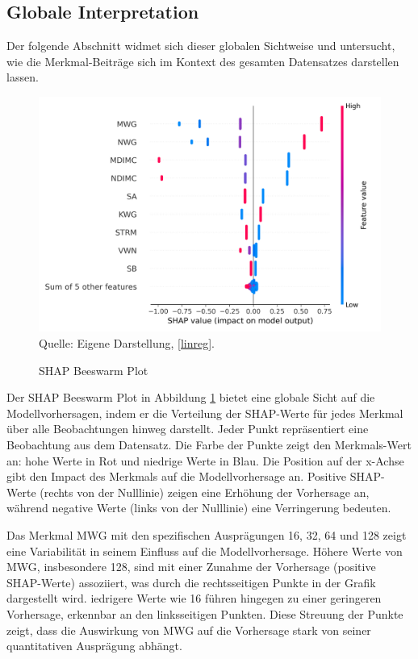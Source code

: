 \subsection{Globale Interpretation}

Der folgende Abschnitt widmet sich dieser globalen Sichtweise und untersucht, 
wie die Merkmal-Beiträge sich im Kontext des gesamten Datensatzes darstellen lassen.

\begin{figure}[!h]
    \caption{SHAP Beeswarm Plot}
    \includegraphics[width=1\textwidth]{../scripts/images/shap_beeswarm_plot_gpu.png}
    Quelle: Eigene Darstellung, \ref{linreg}.
    \label{pic:shap_beeswarm}
\end{figure}

Der SHAP Beeswarm Plot in Abbildung \ref{pic:shap_beeswarm} bietet eine globale 
Sicht auf die Modellvorhersagen, indem er die Verteilung der SHAP-Werte für jedes Merkmal 
über alle Beobachtungen hinweg darstellt. Jeder Punkt repräsentiert eine Beobachtung aus dem Datensatz.
Die Farbe der Punkte zeigt den Merkmals-Wert an: hohe Werte in Rot und niedrige Werte in Blau. 
Die Position auf der x-Achse gibt den Impact des Merkmals auf die Modellvorhersage an. 
Positive SHAP-Werte (rechts von der Nulllinie) zeigen eine Erhöhung der Vorhersage an, 
während negative Werte (links von der Nulllinie) eine Verringerung bedeuten. 

Das Merkmal MWG mit den spezifischen Ausprägungen 16, 32, 64 und 128 zeigt eine Variabilität 
in seinem Einfluss auf die Modellvorhersage. Höhere Werte von MWG, insbesondere 128, 
sind mit einer Zunahme der Vorhersage (positive SHAP-Werte) assoziiert, 
was durch die rechtsseitigen Punkte in der Grafik dargestellt wird. 
iedrigere Werte wie 16 führen hingegen zu einer geringeren Vorhersage, 
erkennbar an den linksseitigen Punkten. Diese Streuung der Punkte zeigt, 
dass die Auswirkung von MWG auf die Vorhersage stark von seiner quantitativen Ausprägung abhängt.

